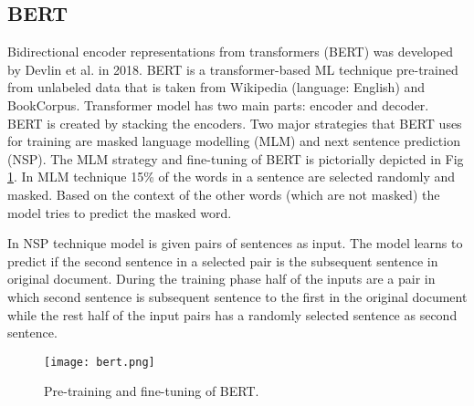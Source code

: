 \documentclass[runningheads]{llncs}
\begin{document}
\subsection{BERT}
Bidirectional encoder representations  from transformers (BERT) was developed by Devlin et al. \cite{devlin2018bert} in 2018. BERT is a transformer-based ML technique pre-trained from unlabeled data that is taken from Wikipedia (language: English) and BookCorpus. Transformer \cite{vaswani2017attention} model has two main parts: encoder and decoder. BERT is created by stacking the encoders. Two major strategies that BERT uses for training are masked language modelling (MLM) and next sentence prediction (NSP). The MLM strategy and fine-tuning of BERT is pictorially depicted in Fig \ref{fig:bert-training}.
In MLM technique 15\% of the words in a sentence are selected randomly and masked. Based on the context of the other words (which are not masked) the model tries to predict the masked word.

In NSP technique model is given pairs of sentences as input. The model learns to predict if the second sentence in a selected pair is the subsequent sentence in original document. During the training phase half of the inputs are a pair in which second sentence is subsequent sentence to the first in the original document while the rest half of the input pairs has a randomly selected sentence as second sentence.

\begin{figure}[H]
  \texttt{[image: bert.png]}
  \caption{Pre-training and fine-tuning of BERT.}
  \label{fig:bert-training}
\end{figure}
\end{document}
